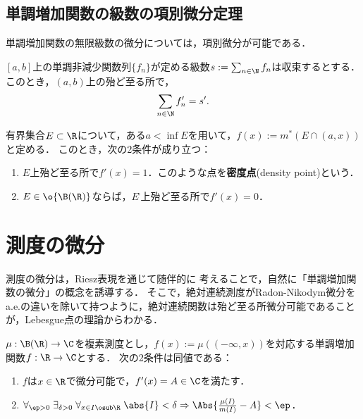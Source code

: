\documentclass[uplatex, dvipdfmx]{jsreport}
\begin{document}
\subsection{単調増加関数の級数の項別微分定理}

\begin{tcolorbox}[colframe=ForestGreen, colback=ForestGreen!10!white,breakable,colbacktitle=ForestGreen!40!white,coltitle=black,fonttitle=\bfseries\sffamily,
title=]
    単調増加関数の無限級数の微分については，項別微分が可能である．
\end{tcolorbox}

\begin{theorem}[Fubiniの項別微分定理 (1915)]
    $[a,b]$上の単調非減少関数列$\{f_n\}$が定める級数$s:=\sum_{n\in\N}f_n$は収束するとする．
    このとき，$(a,b)$上の殆ど至る所で，
    \[\sum_{n\in\N}f'_n=s'.\]
\end{theorem}

\begin{theorem}[Lebesgueの密度定理 (1904)]
    有界集合$E\subset\R$について，ある$a<\inf E$を用いて，$f(x):=m^*(E\cap(a,x))$と定める．
    このとき，次の2条件が成り立つ：
    \begin{enumerate}
        \item $E$上殆ど至る所で$f'(x)=1$．このような点を\textbf{密度点}(density point)という．
        \item $E\in\o{\B(\R)}$ならば，$E^\comp$上殆ど至る所で$f'(x)=0$．
    \end{enumerate}
\end{theorem}

\section{測度の微分}

\begin{tcolorbox}[colframe=ForestGreen, colback=ForestGreen!10!white,breakable,colbacktitle=ForestGreen!40!white,coltitle=black,fonttitle=\bfseries\sffamily,
title=測度は関数の一般化である]
    測度の微分は，Riesz表現を通じて随伴的に
    考えることで，自然に「単調増加関数の微分」の概念を誘導する．
    そこで，絶対連続測度がRadon-Nikodym微分をa.e.の違いを除いて持つように，絶対連続関数は殆ど至る所微分可能であることが，Lebesgue点の理論からわかる．
\end{tcolorbox}

\begin{theorem}[複素測度の微分可能性の特徴付け]
    $\mu:\B(\R)\to\C$を複素測度とし，$f(x):=\mu((-\infty,x))$を対応する単調増加関数$f:\R\to\C$とする．
    次の2条件は同値である：
    \begin{enumerate}
        \item $f$は$x\in\R$で微分可能で，$f'(x)=A\in\C$を満たす．
        \item $\forall_{\ep>0}\;\exists_{\delta>0}\;\forall_{x\in I\osub\R}\;\abs{I}<\delta\Rightarrow\Abs{\frac{\mu(I)}{m(I)}-A}<\ep$．
    \end{enumerate}
\end{theorem}
\end{document}
